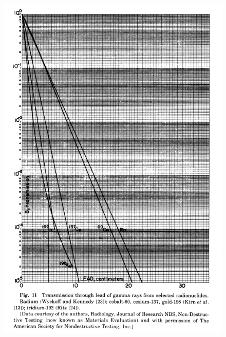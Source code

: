 \documentclass[%
aps,
mph,%
amsmath,amssymb,
preprint,%
tightenlines,
longbibliography,
superscriptaddress,
floatfix,
nofootinbib,
]{revtex4-2}
\begin{document}
    \begin{figure}[h!]
        \centering
        \includegraphics[width=0.75\linewidth]{figures/image.png}
    \end{figure}
\end{document}
